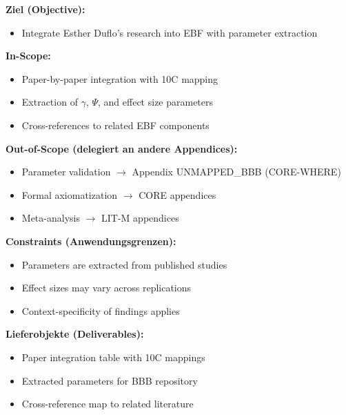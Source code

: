 
\begin{tcolorbox}[
    colback=orange!5!white,
    colframe=orange!75!black,
    title={\textbf{Appendix Scope: Ziel / In-Scope / Out-of-Scope / Constraints}},
    fonttitle=\bfseries
]

\textbf{Ziel (Objective):}
\begin{itemize}[nosep]
    \item Integrate Esther Duflo's research into EBF with parameter extraction
\end{itemize}

\textbf{In-Scope:}
\begin{itemize}[nosep]
    \item Paper-by-paper integration with 10C mapping
    \item Extraction of $\gamma$, $\Psi$, and effect size parameters
    \item Cross-references to related EBF components
\end{itemize}

\textbf{Out-of-Scope (delegiert an andere Appendices):}
\begin{itemize}[nosep]
    \item Parameter validation $\rightarrow$ Appendix UNMAPPED_BBB (CORE-WHERE)
    \item Formal axiomatization $\rightarrow$ CORE appendices
    \item Meta-analysis $\rightarrow$ LIT-M appendices
\end{itemize}

\textbf{Constraints (Anwendungsgrenzen):}
\begin{itemize}[nosep]
    \item Parameters are extracted from published studies
    \item Effect sizes may vary across replications
    \item Context-specificity of findings applies
\end{itemize}

\textbf{Lieferobjekte (Deliverables):}
\begin{itemize}[nosep]
    \item Paper integration table with 10C mappings
    \item Extracted parameters for BBB repository
    \item Cross-reference map to related literature
\end{itemize}

\end{tcolorbox}

